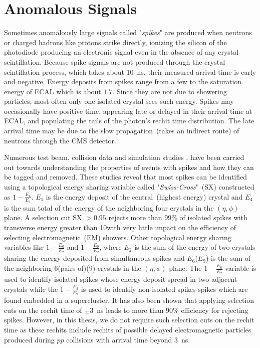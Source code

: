 \section{Anomalous Signals}
Sometimes anomalously large signals called "\textit{spikes}" are produced when neutrons or charged hadrons like protons strike directly, ionizing the silicon of the photodiode  producing an electronic signal even in the absence of any crystal scintillation.
\newline
Because spike signals are not produced through the crystal scintillation process, which takes about 10~ns, their measured arrival time is early and negative. Energy deposits from spikes range from a few \GeV to the saturation energy of ECAL which is about $1.7$\TeV. Since they are not due to showering particles, most often only one isolated crystal sees such energy.  Spikes may occasionally have positive time, appearing late or delayed in their arrival time at ECAL, and populating the tails of the photon's rechit time distribution. The late arrival time may be due to the slow propagation~(takes an indirect route) of neutrons through the CMS detector. 
\par 
Numerous test beam, collision data and simulation studies \cite{spike,spike2}, have been carried out towards understanding the properties of events with spikes and how they can be tagged and removed. 
These studies reveal that most spikes can be identified using a topological energy sharing variable called "\textit{Swiss-Cross}"~(SX) constructed as $1 - \frac{E_{4}}{E_{1}}$. $E_{1}$ is the energy deposit of the central~(highest energy) crystal and $E_{4}$ is the sum total of the energy of the neighboring four crystals in the $(\eta , \phi)$ plane. A selection cut SX $ > 0.95$ rejects more than 99\% of isolated spikes with transverse energy greater than 10\GeV with very little impact on the efficiency of selecting electromagnetic~(EM) showers.
Other topological energy sharing variables like $ 1 - \frac{E_{6}}{E_{2}}$ and $ 1 - \frac{E_{9}}{E_{2}} $, where $E_{2}$ is the sum of the energy of two  crystals sharing the energy deposited from simultaneous spikes and $E_{6}$($E_{9}$) is the sum of the neighboring 6(pairs-of)(9) crystals in the $(\eta , \phi)$ plane. The $1 - \frac{E_{6}}{E_{2}} $ variable is used to identify isolated spikes whose energy deposit spread in two adjacent crystals while the  $ 1 - \frac{E_{2}}{E_{9}} $ is used to identify  non-isolated spikes \ie spikes which are found embedded in a supercluster.
\newline
It has also been shown that applying selection cuts on the rechit time of $ \pm 3$~ns leads to more than 90\% efficiency for rejecting spikes. However, in this thesis, we do not require such selection cuts on the rechit time as these rechits include rechits of possible delayed electromagnetic particles produced during $pp$ collisions with arrival time beyond 3~ns.

